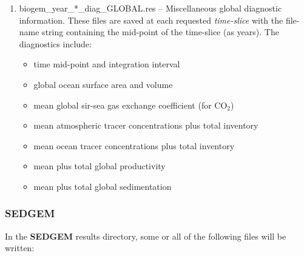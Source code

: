 \documentclass[11pt,fleqn]{book} %
\begin{document}
\begin{enumerate}
\vspace{1mm}\item \textsf{\footnotesize biogem\_year\_*\_diag\_GLOBAL.res} -- Miscellaneous global diagnostic information. These files are saved at each requested \textit{time-slice} with the file-name string containing the mid-point of the time-slice (as years). The diagnostics include:
        \begin{itemize}
                \item time mid-point and integration interval
                \item global ocean surface area and volume
                \item mean global sir-sea gas exchange coefficient (for CO\begin{math}_2\end{math})
                \item mean atmospheric tracer concentrations plus total inventory
                \item mean ocean tracer concentrations plus total inventory
                \item mean plus total global productivity
                \item mean plus total global sedimentation
        \end{itemize}

\end{enumerate}\vspace{2mm}

\subsubsection{SEDGEM}

\noindent In the \textbf{SEDGEM} results directory, some or all of the following files will be written:
\end{document}
